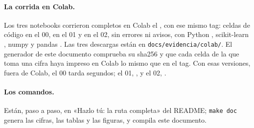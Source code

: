\paragraph{La corrida en Colab.} Los tres notebooks corrieron completos en Colab el
\cifraFechaColab{}, con ese mismo tag: \cifraCeldasCero{} celdas de código en el 00,
\cifraCeldasUno{} en el 01 y \cifraCeldasDos{} en el 02, sin errores ni avisos, con Python
\cifraVersionPythonColab{}, scikit-learn \cifraVersionSklearnColab{}, numpy
\cifraVersionNumpyColab{} y pandas \cifraVersionPandasColab{}. Las tres descargas están en
\texttt{docs/evidencia/colab/}. El generador de este documento comprueba su sha256 y que cada celda
de la que toma una cifra haya impreso en Colab lo mismo que en el tag. Con esas versiones, fuera de
Colab, el 00 tarda \cifraTiempoCero{} segundos; el 01, \cifraTiempoUno{}, y el 02,
\cifraTiempoDos{}.

\paragraph{Los comandos.} Están, paso a paso, en «Hazlo tú: la ruta completa» del README;
\texttt{make doc} genera las cifras, las tablas y las figuras, y compila este documento.
